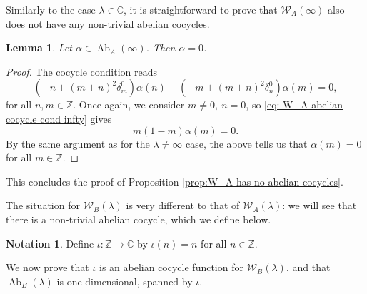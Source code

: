 \documentclass[11pt, svgnames]{amsart}
\newcommand{\ZZ}{\mathbb{Z}}
\newcommand{\CC}{\mathbb{C}}
\newcommand{\W}{\mathcal{W}}
\DeclareMathOperator{\Ab}{Ab}
\newtheorem{lemma}[proposition]{Lemma}
\theoremstyle{definition}
\newtheorem{Notation}[proposition]{Notation}
\begin{document}
Similarly to the case $\lambda \in \CC$, it is straightforward to prove that $\W_A(\infty)$ also does not have any non-trivial abelian cocycles.

\begin{lemma}
    Let $\alpha \in \Ab_A(\infty)$. Then $\alpha = 0$.
\end{lemma}
\begin{proof}
    The cocycle condition reads
    \begin{equation}
    \label{eq: W_A abelian cocycle cond infty}
        (-n+(m+n)^2\delta^0_m)\alpha(n)-(-m+(m+n)^2\delta^0_n)\alpha(m)=0,
    \end{equation}
    for all $n,m \in \ZZ$. Once again, we consider $m\neq 0,\ n=0$, so \eqref{eq: W_A abelian cocycle cond infty} gives 
    \begin{equation}
        m(1-m)\alpha(m)=0.
    \end{equation}
    By the same argument as for the $\lambda\neq\infty$ case, the above tells us that $\alpha(m)=0$ for all $m\in\ZZ$.
\end{proof}

This concludes the proof of Proposition \ref{prop:W_A has no abelian cocycles}.

The situation for $\W_B(\lambda)$ is very different to that of $\W_A(\lambda)$: we will see that there is a non-trivial abelian cocycle, which we define below.

\begin{Notation}\label{ntt:abelian cocycle B}
    Define $\iota \colon \ZZ \to \CC$ by $\iota(n) = n$ for all $n \in \ZZ$.
\end{Notation}

We now prove that $\iota$ is an abelian cocycle function for $\W_B(\lambda)$, and that $\Ab_B(\lambda)$ is one-dimensional, spanned by $\iota$.
\end{document}
